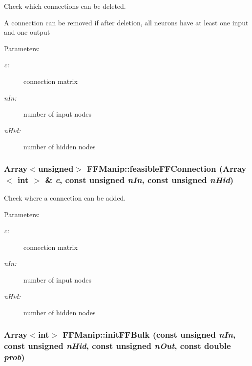 Check which connections can be deleted.

A connection can be removed if after deletion, all neurons have at least one input and one output \begin{Desc}
\item[Parameters: ]\par
\begin{description}
\item[{\em 
c:}]connection matrix \item[{\em 
n\-In:}]number of input nodes \item[{\em 
n\-Hid:}]number of hidden nodes \end{description}
\end{Desc}
\subsubsection{\setlength{\rightskip}{0pt plus 5cm}Array$<$unsigned$>$ FFManip::feasible\-FFConnection (Array$<$ int $>$ \& {\em c}, const unsigned {\em n\-In}, const unsigned {\em n\-Hid})\hspace{0.3cm}{\tt  [protected]}}\label{classFFManip_b11}


Check where a connection can be added.

\begin{Desc}
\item[Parameters: ]\par
\begin{description}
\item[{\em 
c:}]connection matrix \item[{\em 
n\-In:}]number of input nodes \item[{\em 
n\-Hid:}]number of hidden nodes \end{description}
\end{Desc}
\subsubsection{\setlength{\rightskip}{0pt plus 5cm}Array$<$int$>$ FFManip::init\-FFBulk (const unsigned {\em n\-In}, const unsigned {\em n\-Hid}, const unsigned {\em n\-Out}, const double {\em prob})\hspace{0.3cm}{\tt  [protected]}}\label{classFFManip_b0}


